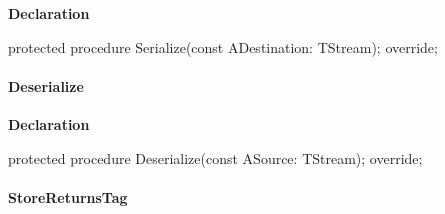 \documentclass{report}
\newif\ifpdf
\begin{document}
\label{PasDoc_Items.TPasMethod-Serialize}
\begin{list}{}{
\setlength{\itemindent}{0cm}
\setlength{\listparindent}{0cm}
\setlength{\leftmargin}{\evensidemargin}
\addtolength{\leftmargin}{\tmplength}
\settowidth{\labelsep}{X}
\addtolength{\leftmargin}{\labelsep}
\setlength{\labelwidth}{\tmplength}
}
\item[\textbf{Declaration}\hfill]
\ifpdf
\begin{flushleft}
\fi
\begin{ttfamily}
protected procedure Serialize(const ADestination: TStream); override;\end{ttfamily}

\ifpdf
\end{flushleft}
\fi

\end{list}
\paragraph*{Deserialize}\hspace*{\fill}

\label{PasDoc_Items.TPasMethod-Deserialize}
\begin{list}{}{
\setlength{\itemindent}{0cm}
\setlength{\listparindent}{0cm}
\setlength{\leftmargin}{\evensidemargin}
\addtolength{\leftmargin}{\tmplength}
\settowidth{\labelsep}{X}
\addtolength{\leftmargin}{\labelsep}
\setlength{\labelwidth}{\tmplength}
}
\item[\textbf{Declaration}\hfill]
\ifpdf
\begin{flushleft}
\fi
\begin{ttfamily}
protected procedure Deserialize(const ASource: TStream); override;\end{ttfamily}

\ifpdf
\end{flushleft}
\fi

\end{list}
\paragraph*{StoreReturnsTag}\hspace*{\fill}
\end{document}
